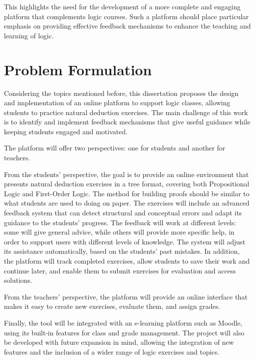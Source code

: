 This highlights the need for the development of a more complete and engaging platform that complements logic courses. Such a platform should place particular emphasis on providing effective feedback mechanisms to enhance the teaching and learning of logic.

\begingroup
\section{Problem Formulation}
\label{tab:problem_formulation}

Considering the topics mentioned before, this dissertation proposes the design and implementation of an online platform to support logic classes, allowing students to practice natural deduction exercises. The main challenge of this work is to identify and implement feedback mechanisms that give useful guidance while keeping students engaged and motivated.  

The platform will offer two perspectives: one for students and another for teachers.  

From the students' perspective, the goal is to provide an online environment that presents natural deduction exercises in a tree format, covering both Propositional Logic and First-Order Logic. The method for building proofs should be similar to what students are used to doing on paper. The exercises will include an advanced feedback system that can detect structural and conceptual errors and adapt its guidance to the students’ progress. The feedback will work at different levels: some will give general advice, while others will provide more specific help, in order to support users with different levels of knowledge. The system will adjust its assistance automatically, based on the students’ past mistakes. In addition, the platform will track completed exercises, allow students to save their work and continue later, and enable them to submit exercises for evaluation and access solutions.  

From the teachers' perspective, the platform will provide an online interface that makes it easy to create new exercises, evaluate them, and assign grades.  

Finally, the tool will be integrated with an e-learning platform such as Moodle, using its built-in features for class and grade management. The project will also be developed with future expansion in mind, allowing the integration of new features and the inclusion of a wider range of logic exercises and topics.  

